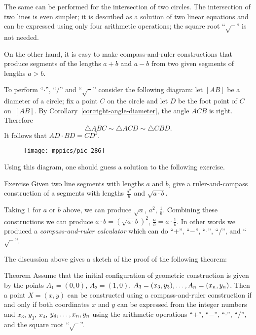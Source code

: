 The same can be performed for the intersection of two circles. 
The intersection of two lines is even simpler; 
it is described as a solution of two linear equations and can be expressed using only four arithmetic operations;
the square root ``$\sqrt{\phantom{a}}$'' is not needed.

\medskip

On the other hand, it is easy to make compass-and-ruler constructions that produce segments of the lengths $a+b$ and $a-b$ from two given segments of lengths $a>b$.

To perform ``$\cdot$'', ``$/$''
and ``$\sqrt{\phantom{a}}$'' consider the following diagram:
let $[AB]$ be a diameter of a circle; 
fix a point $C$ on the circle and let $D$ be the foot point of $C$ on~$[AB]$.
By Corollary~\ref{cor:right-angle-diameter}, the angle $ACB$ is right.
Therefore 
$$\triangle ABC\sim\triangle ACD\sim \triangle CBD.$$
It follows that $AD\cdot BD=CD^2$. 

{

\begin{wrapfigure}[7]{r}{37mm}
\vskip-0mm
\centering
\texttt{[image: mppics/pic-286]}
\end{wrapfigure}

Using this diagram, one should guess a solution to the following exercise.

\begin{thm}{Exercise}\label{ex:a2/b}
Given two line segments with lengths $a$ and $b$, give a ruler-and-compass construction of a segments with lengths $\tfrac {a^2}b$ and $\sqrt{a\cdot b}$.
\end{thm}

Taking $1$ for $a$ or $b$ above, we can produce 
$\sqrt a$, $a^2$, $\tfrac1b$.
Combining these constructions we can produce
$a\cdot b=(\sqrt{a\cdot b})^2$,
$\tfrac ab=a\cdot\tfrac 1b$.
In other words we produced a \emph{compass-and-ruler calculator} which can do ``$+$'', ``$-$'', ``$\cdot$'', ``$/$'', and ``$\sqrt{\phantom{a}}$''.

}

The discussion above gives a sketch of the proof of the following theorem:
 
\begin{thm}{Theorem}\label{thm:constructible-numbers}
Assume that the initial configuration of geometric construction is given by the points $A_1=(0,0)$, $A_2=(1,0)$, $A_3\z=(x_3,y_3),\z\dots,A_n=(x_n,y_n)$.
Then a point $X=(x,y)$ can be constructed using a compass-and-ruler construction
if and only if both coordinates $x$ and $y$ can be expressed from the integer numbers and $x_3$, $y_3$, $x_4$, $y_4,\z\dots,x_n,y_n$ using the arithmetic operations ``$+$'', ``$-$'', ``$\cdot$'', ``$/$'', and the square root ``$\sqrt{\phantom{a}}$''.
\end{thm}

